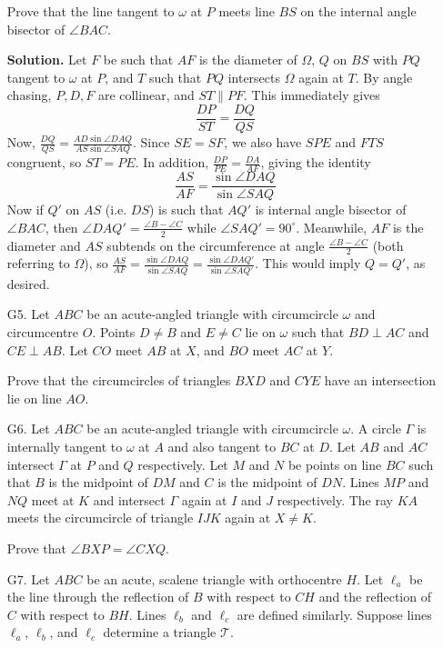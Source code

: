\documentclass[11pt,a4paper]{article}
\begin{document}
\begin{enumerate}
    	Prove that the line tangent to $\omega$ at $P$ meets line $BS$ on the internal angle bisector of $\angle BAC$.
    	
    	\textbf{Solution.} 
    	Let $F$ be such that $AF$ is the diameter of $\Omega$, $Q$ on $BS$ with $PQ$ tangent to $\omega$ at $P$, and $T$ such that $PQ$ intersects $\Omega$ again at $T$.
    	By angle chasing, $P, D, F$ are collinear, and $ST\parallel PF$.
    	This immediately gives
    	$$
    	\frac{DP}{ST} = \frac{DQ}{QS}
    	$$Now, $\frac{DQ}{QS} = \frac{AD\sin\angle DAQ}{AS\sin\angle SAQ}$.
    	Since $SE=SF$, we also have $SPE$ and $FTS$ congruent, so $ST = PE$.
    	In addition, $\frac{DP}{PE} = \frac{DA}{AF}$, giving the identity
    	$$
    	\frac{AS}{AF}=\frac{\sin\angle DAQ}{\sin\angle SAQ}
    	$$Now if $Q'$ on $AS$ (i.e. $DS$) is such that $AQ'$ is internal angle bisector of $\angle BAC$,
    	then $\angle DAQ'=\frac{\angle B - \angle C}{2}$ while $\angle SAQ'=90^{\circ}$.
    	Meanwhile, $AF$ is the diameter and $AS$ subtends on the circumference at angle $\frac{\angle B - \angle C}{2}$
    	(both referring to $\Omega$),
    	so $\frac{AS}{AF}=\frac{\sin\angle DAQ}{\sin\angle SAQ}=\frac{\sin\angle DAQ'}{\sin\angle SAQ'}$.
    	This would imply $Q=Q'$, as desired.
    	
    	\item [G5.] 
    	Let $ABC$ be an acute-angled triangle with circumcircle $\omega$ and circumcentre $O$. Points $D\neq B$ and $E\neq C$ lie on $\omega$ such that $BD\perp AC$ and $CE\perp AB$. Let $CO$ meet $AB$ at $X$, and $BO$ meet $AC$ at $Y$.
    	
    	Prove that the circumcircles of triangles $BXD$ and $CYE$ have an intersection lie on line $AO$.
    	
    	\item [G6.] 
    	Let $ABC$ be an acute-angled triangle with circumcircle $\omega$. A circle $\Gamma$ is internally tangent to $\omega$ at $A$ and also tangent to $BC$ at $D$. Let $AB$ and $AC$ intersect $\Gamma$ at $P$ and $Q$ respectively. Let $M$ and $N$ be points on line $BC$ such that $B$ is the midpoint of $DM$ and $C$ is the midpoint of $DN$. Lines $MP$ and $NQ$ meet at $K$ and intersect $\Gamma$ again at $I$ and $J$ respectively. The ray $KA$ meets the circumcircle of triangle $IJK$ again at $X\neq K$.
    	
    	Prove that $\angle BXP = \angle CXQ$.
    	
    	
    	\item [G7.] 
    	Let $ABC$ be an acute, scalene triangle with orthocentre $H$. Let $\ell_a$ be the line through the reflection of $B$ with respect to $CH$ and the reflection of $C$ with respect to $BH$. Lines $\ell_b$ and $\ell_c$ are defined similarly. Suppose lines $\ell_a$, $\ell_b$, and $\ell_c$ determine a triangle $\mathcal T$.
    	

\end{enumerate}
\end{document}
